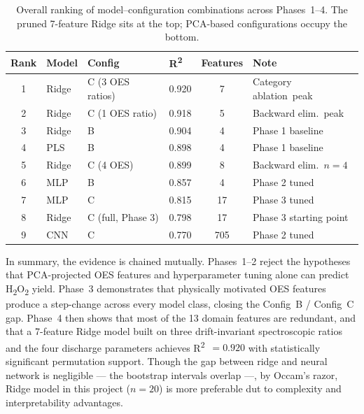 \documentclass[12pt, a4paper]{article}
\begin{document}
\begin{table}[H]
    \centering
    \small
    \caption{Overall ranking of model--configuration combinations across Phases~1--4. The pruned 7-feature Ridge sits at the top; PCA-based configurations occupy the bottom.}
    \label{tab:model_ranking}
    \begin{tabular}{clllcl}
        \toprule
        \textbf{Rank} & \textbf{Model} & \textbf{Config} & \textbf{R\textsuperscript{2}} & \textbf{Features} & \textbf{Note} \\
        \midrule
        1 & Ridge & C (3 OES ratios)  & 0.920 &  7 & Category ablation\ peak\\
        2 & Ridge & C (1 OES ratio)   & 0.918 &  5 & Backward elim.\ peak \\
        3 & Ridge & B                 & 0.904 &  4 & Phase 1 baseline \\
        4 & PLS   & B                 & 0.898 &  4 & Phase 1 baseline \\
        5 & Ridge & C (4 OES)         & 0.899 &  8 & Backward elim.\ $n{=}4$\\
        6 & MLP   & B                 & 0.857 &  4 & Phase 2 tuned \\
        7 & MLP   & C                 & 0.815 & 17 & Phase 3 tuned \\
        8 & Ridge & C (full, Phase 3) & 0.798 & 17 & Phase 3 starting point \\
        9 & CNN   & C                 & 0.770 & 705 & Phase 2 tuned \\
        \bottomrule
    \end{tabular}
\end{table}

In summary, the evidence is chained mutually. Phases~1--2 reject the hypotheses that PCA-projected OES features and hyperparameter tuning alone can predict H\textsubscript{2}O\textsubscript{2} yield. Phase~3 demonstrates that physically motivated OES features produce a step-change across every model class, closing the Config~B / Config~C gap. Phase~4 then shows that most of the 13 domain features are redundant, and that a 7-feature Ridge model built on three drift-invariant spectroscopic ratios and the four discharge parameters achieves R\textsuperscript{2}~$=0.920$ with statistically significant permutation support. Though the gap between ridge and neural network is negligible --- the bootstrap intervals overlap ---, by Occam's razor, Ridge model in this project ($n=20$) is more preferable dut to complexity and interpretability advantages.
\end{document}
